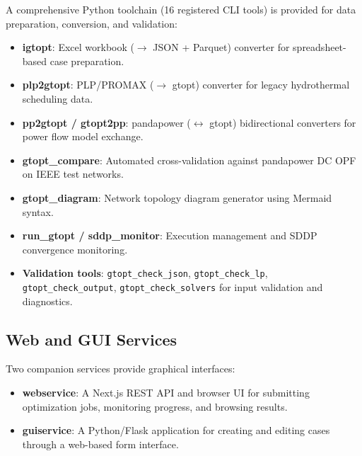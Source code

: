 A comprehensive Python toolchain (16 registered CLI tools) is provided
for data preparation, conversion, and validation:

\begin{itemize}
  \item \textbf{igtopt}: Excel workbook ($\rightarrow$ JSON + Parquet)
    converter for spreadsheet-based case preparation.
  \item \textbf{plp2gtopt}: PLP/PROMAX ($\rightarrow$ gtopt) converter
    for legacy hydrothermal scheduling data.
  \item \textbf{pp2gtopt / gtopt2pp}: pandapower
    ($\leftrightarrow$ gtopt) bidirectional converters for power flow
    model exchange.
  \item \textbf{gtopt\_compare}: Automated cross-validation against
    pandapower DC OPF on IEEE test networks.
  \item \textbf{gtopt\_diagram}: Network topology diagram generator
    using Mermaid syntax.
  \item \textbf{run\_gtopt / sddp\_monitor}: Execution management and
    SDDP convergence monitoring.
  \item \textbf{Validation tools}: \texttt{gtopt\_check\_json},
    \texttt{gtopt\_check\_lp}, \texttt{gtopt\_check\_output},
    \texttt{gtopt\_check\_solvers} for input validation and diagnostics.
\end{itemize}

\subsection{Web and GUI Services}

Two companion services provide graphical interfaces:

\begin{itemize}
  \item \textbf{webservice}: A Next.js REST API and browser UI for
    submitting optimization jobs, monitoring progress, and browsing
    results.
  \item \textbf{guiservice}: A Python/Flask application for creating
    and editing cases through a web-based form interface.
\end{itemize}
